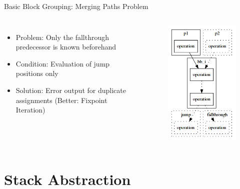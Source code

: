 \documentclass[11pt]{beamer}
\begin{document}
\begin{frame}{Basic Block Grouping: Merging Paths Problem}
\begin{columns}
\begin{itemize}
    \item<1-> Problem: Only the fallthrough predecessor is known beforehand
    \item<2-> Condition: Evaluation of jump positions only
    \item<3-> Solution: Error output for duplicate assignments (Better: Fixpoint Iteration)
\end{itemize}
    \begin{figure}
        \centering
        \includegraphics[scale=0.35]{figures/mpp1.png}
    \end{figure}
\end{columns}
\end{frame}

\section{Stack Abstraction}
\end{document}
